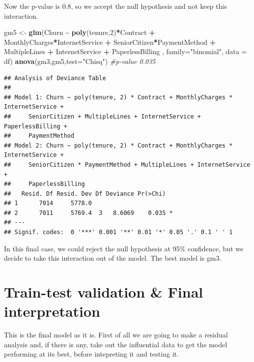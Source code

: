 \documentclass[
]{article}
\newenvironment{Shaded}{\begin{snugshade}}{\end{snugshade}}
\newcommand{\AttributeTok}[1]{\textcolor[rgb]{0.13,0.29,0.53}{#1}}
\newcommand{\CommentTok}[1]{\textcolor[rgb]{0.56,0.35,0.01}{\textit{#1}}}
\newcommand{\DecValTok}[1]{\textcolor[rgb]{0.00,0.00,0.81}{#1}}
\newcommand{\FunctionTok}[1]{\textcolor[rgb]{0.13,0.29,0.53}{\textbf{#1}}}
\newcommand{\NormalTok}[1]{#1}
\newcommand{\OtherTok}[1]{\textcolor[rgb]{0.56,0.35,0.01}{#1}}
\newcommand{\SpecialCharTok}[1]{\textcolor[rgb]{0.81,0.36,0.00}{\textbf{#1}}}
\newcommand{\StringTok}[1]{\textcolor[rgb]{0.31,0.60,0.02}{#1}}
\begin{document}
Now the p-value is 0.8, so we accept the null hypothesis and not keep
this interaction.

\begin{Shaded}
\begin{Highlighting}[]
\NormalTok{gm5 }\OtherTok{\textless{}{-}} \FunctionTok{glm}\NormalTok{(Churn }\SpecialCharTok{\textasciitilde{}} \FunctionTok{poly}\NormalTok{(tenure,}\DecValTok{2}\NormalTok{)}\SpecialCharTok{*}\NormalTok{Contract }\SpecialCharTok{+}\NormalTok{ MonthlyCharges}\SpecialCharTok{*}\NormalTok{InternetService }\SpecialCharTok{+}\NormalTok{ SeniorCitizen}\SpecialCharTok{*}\NormalTok{PaymentMethod }\SpecialCharTok{+}\NormalTok{ MultipleLines }\SpecialCharTok{+}\NormalTok{ InternetService }\SpecialCharTok{+}\NormalTok{ PaperlessBilling , }\AttributeTok{family=}\StringTok{"binomial"}\NormalTok{, }\AttributeTok{data =}\NormalTok{ df)}
\FunctionTok{anova}\NormalTok{(gm3,gm5,}\AttributeTok{test=}\StringTok{"Chisq"}\NormalTok{) }\CommentTok{\#p{-}value 0.035   }
\end{Highlighting}
\end{Shaded}

\begin{verbatim}
## Analysis of Deviance Table
## 
## Model 1: Churn ~ poly(tenure, 2) * Contract + MonthlyCharges * InternetService + 
##     SeniorCitizen + MultipleLines + InternetService + PaperlessBilling + 
##     PaymentMethod
## Model 2: Churn ~ poly(tenure, 2) * Contract + MonthlyCharges * InternetService + 
##     SeniorCitizen * PaymentMethod + MultipleLines + InternetService + 
##     PaperlessBilling
##   Resid. Df Resid. Dev Df Deviance Pr(>Chi)  
## 1      7014     5778.0                       
## 2      7011     5769.4  3   8.6069    0.035 *
## ---
## Signif. codes:  0 '***' 0.001 '**' 0.01 '*' 0.05 '.' 0.1 ' ' 1
\end{verbatim}

In this final case, we could reject the null hypothesis at 95\%
confidence, but we decide to take this interaction out of the model. The
best model is gm3.

\hypertarget{train-test-validation-final-interpretation}{%
\section{Train-test validation \& Final
interpretation}\label{train-test-validation-final-interpretation}}

This is the final model as it is. First of all we are going to make a
residual analysis and, if there is any, take out the influential data to
get the model performing at its best, before intepreting it and testing
it.
\end{document}
